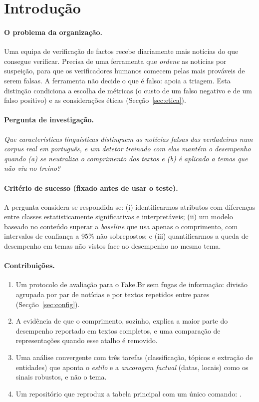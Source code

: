 \section{Introdução}\label{sec:intro}

\paragraph{O problema da organização.}
Uma equipa de verificação de factos recebe diariamente mais notícias do que consegue verificar.
Precisa de uma ferramenta que \emph{ordene} as notícias por suspeição, para que os verificadores
humanos comecem pelas mais prováveis de serem falsas. A ferramenta não decide o que é falso: apoia
a triagem. Esta distinção condiciona a escolha de métricas (o custo de um falso negativo e de um
falso positivo) e as considerações éticas (Secção~\ref{sec:etica}).

\paragraph{Pergunta de investigação.}
\emph{Que características linguísticas distinguem as notícias falsas das verdadeiras num corpus real
em português, e um detetor treinado com elas mantém o desempenho quando (a) se neutraliza o
comprimento dos textos e (b) é aplicado a temas que não viu no treino?}

\paragraph{Critério de sucesso (fixado antes de usar o teste).}
A pergunta considera-se respondida se: (i) identificarmos atributos com diferenças entre classes
estatisticamente significativas e interpretáveis; (ii) um modelo baseado no conteúdo superar a
\emph{baseline} que usa apenas o comprimento, com intervalos de confiança a 95\% não sobrepostos;
e (iii) quantificarmos a queda de desempenho em temas não vistos face ao desempenho no mesmo tema.

\paragraph{Contribuições.}
\begin{enumerate}
\item Um protocolo de avaliação para o Fake.Br sem fugas de informação: divisão agrupada por par de
notícias e por textos repetidos entre pares (Secção~\ref{sec:config}).
\item A evidência de que o comprimento, sozinho, explica a maior parte do desempenho reportado em
textos completos, e uma comparação de representações quando esse atalho é removido.
\item Uma análise convergente com três tarefas (classificação, tópicos e extração de entidades) que
aponta o \emph{estilo} e a \emph{ancoragem factual} (datas, locais) como os sinais robustos, e não o tema.
\item Um repositório que reproduz a tabela principal com um único comando: \repo.
\end{enumerate}

